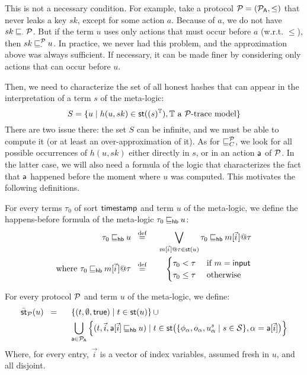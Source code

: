 \begin{remark}
  This is not a necessary condition. For example, take a protocol $\mathcal{P} = (\mathcal{P}_{\textsf{A}},\le)$ that never leaks a key $sk$, except for some action $a$. Because of $a$, we do not have $sk \mathbin{\sqsubseteq}_{\cdot} \mathcal{P}$. But if the term $u$ uses only actions that must occur before $a$ (w.r.t. $\le$), then $sk \mathbin{\sqsubseteq}^{\mathcal{P}}_{\cdot} u$. In practice, we never had this problem, and the approximation above was always sufficient. If necessary, it can be made finer by considering only actions that can occur before $u$.
\end{remark}

Then, we need to characterize the set of all honest hashes that can appear in the interpretation of a term $s$ of the meta-logic:
\[
  S = \{u \mid h(u,sk) \in \mathsf{st}((s)^{\mathbb{T}}),
  \mathbb{T} \text{ a $\mathcal{P}$-trace model}\}
\]
There are two issue there: the set $S$ can be infinite, and we must be able to compute it (or at least an over-approximation of it). As for $\mathbin{\sqsubseteq}^{\mathcal{P}}_{C}$, we look for all possible occurrences of $h(u,sk)$ either directly in $s$, or in an action $\textsf{a}$ of $\mathcal{P}$. In the latter case, we will also need a formula of the logic that characterizes the fact that $\textsf{a}$ happened before the moment where $u$ was computed. This motivates the following definitions.

\begin{definition}
  For every terms $\tau_0$ of sort $\textsf{timestamp}$ and term $u$ of the meta-logic, we define the happens-before formula of the meta-logic $\tau_0 \mathbin{\sqsubseteq_{\textsf{hb}}} u$:
  \begin{alignat*}{2}
    \tau_0 \lehb u &\;\;\overset{\text{def}}{=}\;\;&
    \bigvee_{m[\pvec{i}]@\tau \in \st(u)}
    \tau_0 \lehb m[\pvec{i}]@\tau\\
    \text{where }\tau_0 \lehb m[\pvec{i}]@\tau  &\;\;\overset{\text{def}}{=}\;\;&
    \begin{cases}
      \tau_0 < \tau &\text{ if } m = \minp\\
      \tau_0 \le \tau &\text{ otherwise}
    \end{cases}
  \end{alignat*} 
\end{definition}

\begin{definition}
  For every protocol $\mathcal{P}$ and term $u$ of the meta-logic, we define:
  \begin{alignat*}{2}
    \bar{\mathsf{st}}_{\mathcal{P}}(u) &\;\;=\;\;&&
    \left\{
      (t, \emptyset, \textsf{true}) \mid t \in \mathsf{st}(u)
    \right\}
    \cup\\
    &&&\bigcup_{\textsf{a} \in \mathcal{P}_{\textsf{A}}}
    \left\{
      (t, \vec{i}, \textsf{a}[\vec{i}] \mathbin{\sqsubseteq_{\textsf{hb}}} u) \mid
      t \in \mathsf{st}\big(\{\phi_{\alpha},o_{\alpha},u^s_{\alpha} \mid s \in\mathcal{S}\},
      \alpha = \textsf{a}[\vec{i}]
      \big)
    \right\}
  \end{alignat*}
  Where, for every entry, $\vec{i}$ is a vector of index variables, assumed fresh in $u$, and all disjoint.
\end{definition}

